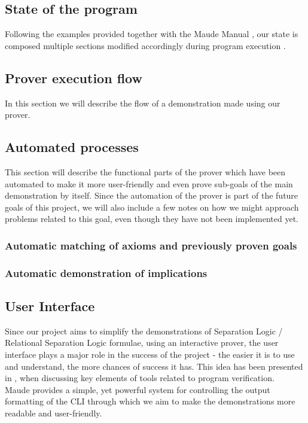 \documentclass[12pt,a4paper]{article}
\begin{document}
\subsection{State of the program}
Following the examples provided together with the Maude Manual \cite{manual}, our state is composed multiple sections modified accordingly during program execution .
\subsection{Prover execution flow}
In this section we will describe the flow of a demonstration made using our prover.
\subsection{Automated processes}
This section will describe the functional parts of the prover which have been automated to make it more user-friendly and even prove sub-goals of the main demonstration by itself. Since the automation of the prover is part of the future goals of this project, we will also include a few notes on how we might approach problems related to this goal, even though they have not been implemented yet.
\subsubsection{Automatic matching of axioms and previously proven goals}
\subsubsection{Automatic demonstration of implications}
\subsection{User Interface}
Since our project aims to simplify the demonstrations of Separation Logic / Relational Separation Logic formulae, using an interactive prover, the user interface plays a major role in the success of the project - the easier it is to use and understand, the more chances of success it has. This idea has been presented in \cite{primer}, when discussing key elements of tools related to program verification. \\

Maude provides a simple, yet powerful system for controlling the output formatting of the CLI through which we aim to make the demonstrations more readable and user-friendly. \\
\end{document}
